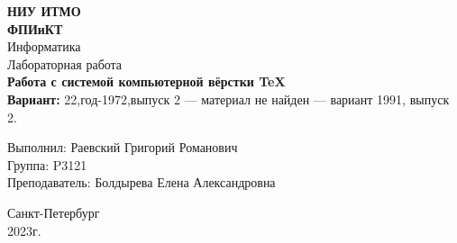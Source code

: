
\graphicspath{ {./images/} }



\usetikzlibrary{circuits}


%



\setcounter{secnumdepth}{-1}
\thispagestyle{empty}
\begin{center}
    \textbf{НИУ ИТМО}
    \\
    \textbf{ФПИиКТ}
    \\
    \vspace{20em}
    {\LARGE Информатика}
    \\\vspace{1em}
    {\Large Лабораторная работа }
    \\\vspace{1em}
    {\Large \textbf{Работа с системой компьютерной вёрстки \TeX}}
    \\\vspace{1em}
    \textbf{Вариант:} 22,год-1972,выпуск 2 — материал не найден — вариант 1991, выпуск 2.
\end{center}

\vspace{12em}

\begin{flushright}
    Выполнил: Раевский Григорий Романович
    \\\vspace{1em}
    Группа: P3121
    \\\vspace{1em}
    Преподаватель: Болдырева Елена Александровна
    \\\vspace{1em}
\end{flushright}
\vspace{12em}
\begin{center}
Санкт-Петербург
\\
2023г.

\end{center}

%